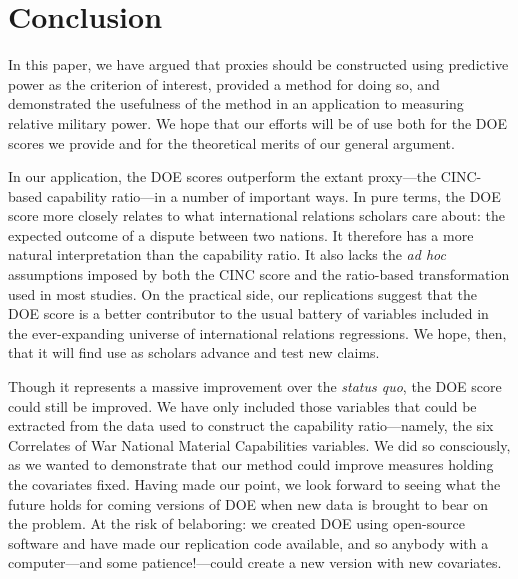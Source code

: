 
\section{Conclusion}
\label{sec:conclusion}

In this paper, we have argued that proxies should be constructed using predictive power as the criterion of interest, provided a method for doing so, and demonstrated the usefulness of the method in an application to measuring relative military power.
We hope that our efforts will be of use both for the DOE scores we provide and for the theoretical merits of our general argument.

In our application, the DOE scores outperform the extant proxy---the CINC-based capability ratio---in a number of important ways.
In pure terms, the DOE score more closely relates to what international relations scholars care about: the expected outcome of a dispute between two nations.
It therefore has a more natural interpretation than the capability ratio.
It also lacks the \emph{ad hoc} assumptions imposed by both the CINC score and the ratio-based transformation used in most studies.
On the practical side, our replications suggest that the DOE score is a better contributor to the usual battery of variables included in the ever-expanding universe of international relations regressions.
We hope, then, that it will find use as scholars advance and test new claims.

Though it represents a massive improvement over the \emph{status quo}, the DOE score could still be improved.
We have only included those variables that could be extracted from the data used to construct the capability ratio---namely, the six Correlates of War National Material Capabilities variables.
We did so consciously, as we wanted to demonstrate that our method could improve measures holding the covariates fixed.
Having made our point, we look forward to seeing what the future holds for coming versions of DOE when new data is brought to bear on the problem.
At the risk of belaboring: we created DOE using open-source software and have made our replication code available, and so anybody with a computer---and some patience!---could create a new version with new covariates.

